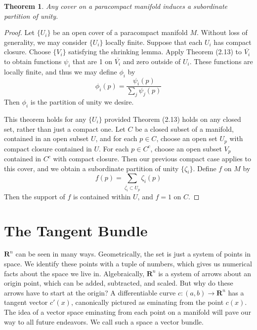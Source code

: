 \documentclass[12pt]{report}
\theoremstyle{plain}
\newtheorem{theorem}{Theorem}[chapter]
\theoremstyle{definition}
\begin{document}
\begin{theorem}
    Any cover on a paracompact manifold induces a subordinate partition of unity.
\end{theorem}
\begin{proof}
    Let $\{ U_i \}$ be an open cover of a paracompact manifold $M$. Without loss of generality, we may consider $\{ U_i \}$ locally finite. Suppose that each $U_i$ has compact closure. Choose $\{ V_i \}$ satisfying the shrinking lemma. Apply Theorem (2.13) to $\overline{V_i}$ to obtain functions $\psi_i$ that are 1 on $\overline{V_i}$ and zero outside of $U_i$. These functions are locally finite, and thus we may define $\phi_i$ by
    \[ \phi_i(p) = \frac{\psi_i(p)}{\sum_j \psi_j(p)} \]
    Then $\phi_i$ is the partition of unity we desire.

    This theorem holds for any $\{ U_i \}$ provided Theorem (2.13) holds on any closed set, rather than just a compact one. Let $C$ be a closed subset of a manifold, contained in an open subset $U$, and for each $p \in C$, choose an open set $U_p$ with compact closure contained in $U$. For each $p \in C^c$, choose an open subset $V_p$ contained in $C^c$ with compact closure. Then our previous compact case applies to this cover, and we obtain a subordinate partition of unity $\{ \zeta_i \}$. Define $f$ on $M$ by
    \[ f(p) = \sum_{\overline{\zeta_i} \subset U_p} \zeta_i(p) \]
    Then the support of $f$ is contained within $U$, and $f = 1$ on $C$.
\end{proof}




\chapter{The Tangent Bundle}

$\mathbf{R}^n$ can be seen in many ways. Geometrically, the set is just a system of points in space. We identify these points with a tuple of numbers, which gives us numerical facts about the space we live in. Algebraically, $\mathbf{R}^n$ is a system of arrows about an origin point, which can be added, subtracted, and scaled. But why do these arrows have to start at the origin? A differentiable curve $c:(a,b) \to \mathbf{R}^n$ has a tangent vector $c'(x)$, canonically pictured as eminating from the point $c(x)$. The idea of a vector space eminating from each point on a manifold will pave our way to all future endeavors. We call such a space a vector bundle.
\end{document}
